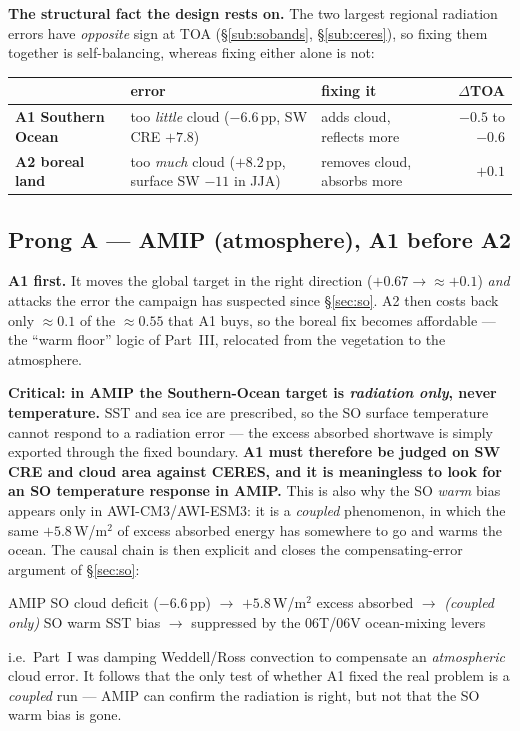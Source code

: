 \documentclass[10pt]{article}
\begin{document}
\textbf{The structural fact the design rests on.} The two largest regional radiation errors have
\emph{opposite} sign at TOA (\S\ref{sub:sobands}, \S\ref{sub:ceres}), so fixing them together is
self-balancing, whereas fixing either alone is not:

\begin{center}\small
\begin{tabular}{l l l r}
\toprule
 & error & fixing it & $\Delta$TOA \\
\midrule
\textbf{A1 Southern Ocean} & too \emph{little} cloud ($-6.6$\,pp, SW CRE $+7.8$) & adds cloud, reflects more &
$\mathbf{-0.5}$ to $-0.6$ \\
\textbf{A2 boreal land} & too \emph{much} cloud ($+8.2$\,pp, surface SW $-11$ in JJA) & removes cloud, absorbs more &
$\mathbf{+0.1}$ \\
\bottomrule
\end{tabular}
\end{center}

\subsection{Prong A --- AMIP (atmosphere), A1 before A2}
\textbf{A1 first.} It moves the global target in the right direction ($+0.67\to\approx+0.1$) \emph{and}
attacks the error the campaign has suspected since \S\ref{sec:so}. A2 then costs back only $\approx0.1$ of the
$\approx0.55$ that A1 buys, so the boreal fix becomes affordable --- the ``warm floor'' logic of Part~III,
relocated from the vegetation to the atmosphere.

\textbf{Critical: in AMIP the Southern-Ocean target is \emph{radiation only}, never temperature.}
SST and sea ice are prescribed, so the SO surface temperature cannot respond to a radiation error --- the
excess absorbed shortwave is simply exported through the fixed boundary. \textbf{A1 must therefore be judged
on SW CRE and cloud area against CERES, and it is meaningless to look for an SO temperature response in
AMIP.} This is also why the SO \emph{warm} bias appears only in AWI-CM3/AWI-ESM3: it is a \emph{coupled}
phenomenon, in which the same $+5.8$\,W/m$^2$ of excess absorbed energy has somewhere to go and warms the
ocean. The causal chain is then explicit and closes the compensating-error argument of \S\ref{sec:so}:
\begin{center}\small
AMIP SO cloud deficit ($-6.6$\,pp) $\to$ $+5.8$\,W/m$^2$ excess absorbed $\to$
\emph{(coupled only)} SO warm SST bias $\to$ suppressed by the 06T/06V ocean-mixing levers
\end{center}
i.e.\ Part~I was damping Weddell/Ross convection to compensate an \emph{atmospheric} cloud error. It follows
that the only test of whether A1 fixed the real problem is a \emph{coupled} run --- AMIP can confirm the
radiation is right, but not that the SO warm bias is gone.
\end{document}

